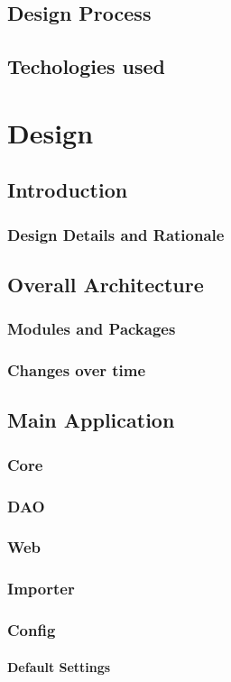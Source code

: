 \section{Design Process}
\section{Techologies used}
\chapter{Design}
\section{Introduction}
\subsection{Design Details and Rationale}
\section{Overall Architecture}
\subsection{Modules and Packages}
\subsection{Changes over time}
\section{Main Application}
\subsection{Core}
\subsection{DAO}
\subsection{Web}
\subsection{Importer}
\subsection{Config}
\subsubsection{Default Settings}
